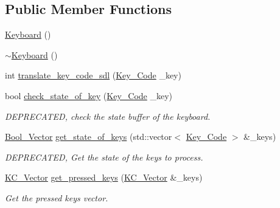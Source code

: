 \subsection*{Public Member Functions}
\begin{DoxyCompactItemize}
\item 
\mbox{\hyperlink{classbanita_1_1_keyboard_a23037aab0ad7e176946b93e971cf946c}{Keyboard}} ()
\item 
\mbox{\hyperlink{classbanita_1_1_keyboard_ab74e25dd5635a78f3fa18b4813e22888}{$\sim$\+Keyboard}} ()
\item 
int \mbox{\hyperlink{classbanita_1_1_keyboard_afba73737bfad5061446a38a5a925cbfe}{translate\+\_\+key\+\_\+code\+\_\+sdl}} (\mbox{\hyperlink{classbanita_1_1_keyboard_a0dee214e6cb4f246866603b85568b9ab}{Key\+\_\+\+Code}} \+\_\+key)
\item 
bool \mbox{\hyperlink{classbanita_1_1_keyboard_a7d92be8f7f9f629d8ec4f8da0c5367d5}{check\+\_\+state\+\_\+of\+\_\+key}} (\mbox{\hyperlink{classbanita_1_1_keyboard_a0dee214e6cb4f246866603b85568b9ab}{Key\+\_\+\+Code}} \+\_\+key)
\begin{DoxyCompactList}\small\item\em D\+E\+P\+R\+E\+C\+A\+T\+ED, check the state buffer of the keyboard. \end{DoxyCompactList}\item 
\mbox{\hyperlink{classbanita_1_1_keyboard_a0bd55b31db3e776ec4c8a2effc5b3cd8}{Bool\+\_\+\+Vector}} \mbox{\hyperlink{classbanita_1_1_keyboard_afa10793b2c2bfe8ab32afe8a6d573e5e}{get\+\_\+state\+\_\+of\+\_\+keys}} (std\+::vector$<$ \mbox{\hyperlink{classbanita_1_1_keyboard_a0dee214e6cb4f246866603b85568b9ab}{Key\+\_\+\+Code}} $>$ \&\+\_\+keys)
\begin{DoxyCompactList}\small\item\em D\+E\+P\+R\+E\+C\+A\+T\+ED, Get the state of the keys to process. \end{DoxyCompactList}\item 
\mbox{\hyperlink{classbanita_1_1_keyboard_ac39ec62a0a07ee3e90cc742b6b2ecb97}{K\+C\+\_\+\+Vector}} \mbox{\hyperlink{classbanita_1_1_keyboard_a86160c6cee9390a757e4207feb6d082b}{get\+\_\+pressed\+\_\+keys}} (\mbox{\hyperlink{classbanita_1_1_keyboard_ac39ec62a0a07ee3e90cc742b6b2ecb97}{K\+C\+\_\+\+Vector}} \&\+\_\+keys)
\begin{DoxyCompactList}\small\item\em Get the pressed keys vector. \end{DoxyCompactList}\end{DoxyCompactItemize}
